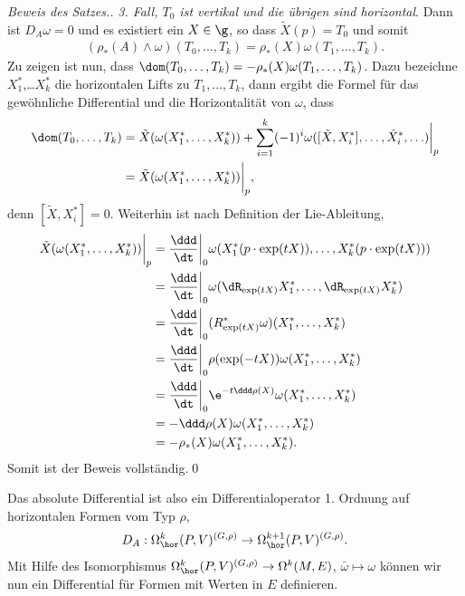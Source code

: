 \documentclass[%
	paper=a5,%
	fleqn,%
	DIV=18,%
	BCOR=0mm,
	fontsize=11pt,
	titlepage=false,%
	bibliography=totoc,
	DIV=18,%
	twoside=true,
	pdftitle=Riemannsche Geometrie,
	pdfauthor=Uwe Semmelmann,
	numbers=noendperiod]%
	{scrbook}
\begin{document}
\begin{proof}[Beweis des Satzes.]
\textit{3. Fall, $T_0$ ist vertikal und die übrigen sind horizontal}. Dann ist
$D_A\omega = 0$ und es existiert ein $X\in \g$, so dass $\widetilde{X}(p) = T_0$
und somit
\begin{align*}
(\rho_*(A)\wedge\omega)(T_0,\ldots,T_k) = 
\rho_*(X)\omega(T_1,\ldots,T_k).
\end{align*}
Zu zeigen ist nun, dass $\dom(T_0,\ldots,T_k) =
-\rho_*(X)\omega(T_1,\ldots,T_k)$. Dazu bezeichne $X_1^*$,\ldots $X_k^*$ die
horizontalen Lifts zu $T_1,\ldots,T_k$, dann ergibt die Formel für das
gewöhnliche Differential und die Horizontalität von $\omega$, dass
\begin{align*}
\dom(T_0,\ldots,T_k) &= 
\tilde{X}(\omega(X_1^*,\ldots,X_k^*))
+ \sum_{i=1}^k
(-1)^{i} 
\omega([\tilde{X},X_i^*],\ldots,\hat{X}_i^*,\ldots)
\bigg|_{p}
\\
&= \tilde{X}(\omega(X_1^*,\ldots,X_k^*))\bigg|_{p},
\end{align*}
denn $[\tilde{X},X_i^*] = 0$. Weiterhin ist nach Definition der Lie-Ableitung,
\begin{align*}
\tilde{X}(\omega(X_1^*,\ldots,X_k^*))\bigg|_{p} &= 
\frac{\ddd}{\dt}\bigg|_0
\omega(X_1^*(p\cdot \exp(tX)),\ldots,X_k^*(p\cdot \exp(tX)))\\
&=
\frac{\ddd}{\dt}\bigg|_0
\omega(\dR_{\exp(tX)}X_1^*,\ldots,\dR_{\exp(tX)}X_k^*)\\
&= \frac{\ddd}{\dt}\bigg|_0
(R_{\exp(tX)}^*\omega)(X_1^*,\ldots,X_k^*)\\
&= \frac{\ddd}{\dt}\bigg|_0
\rho(\exp(-tX))\omega(X_1^*,\ldots,X_k^*)\\
&= \frac{\ddd}{\dt}\bigg|_0
\e^{-t\ddd\rho(X)}\omega(X_1^*,\ldots,X_k^*)\\
&= -\ddd\rho(X)\omega(X_1^*,\ldots,X_k^*)\\
&= -\rho_*(X)\omega(X_1^*,\ldots,X_k^*).
\end{align*}
Somit ist der Beweis vollständig.\qed
\end{proof}


Das absolute Differential ist also ein Differentialoperator 1. Ordnung auf
horizontalen Formen vom Typ $\rho$,
\begin{align*}
D_A : \Omega_\hor^k(P,V)^{(G,\rho)}\to \Omega_\hor^{k+1}(P,V)^{(G,\rho)}.
\end{align*}
Mit Hilfe des Isomorphismus $\Omega_\hor^k(P,V)^{(G,\rho)}\to \Omega^k(M,E)$,
$\bar{\omega}\mapsto \omega$ können wir nun ein Differential für Formen
mit Werten in $E$ definieren.
\end{document}
